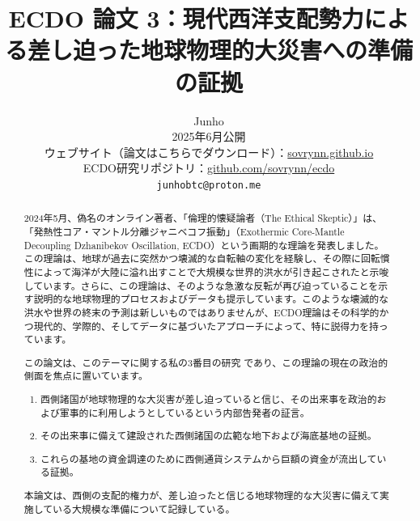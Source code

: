 \documentclass[10pt,twocolumn,letterpaper]{article}
\begin{document}
\title{ECDO 論文 3：現代西洋支配勢力による差し迫った地球物理的大災害への準備の証拠}

\author{Junho\\
2025年6月公開\\
ウェブサイト（論文はこちらでダウンロード）：\href{https://sovrynn.github.io}{sovrynn.github.io}\\
ECDO研究リポジトリ：\href{https://github.com/sovrynn/ecdo}{github.com/sovrynn/ecdo}\\
{\tt\small junhobtc@proton.me}
}

\maketitle

\begin{abstract}
2024年5月、偽名のオンライン著者、「倫理的懐疑論者（The Ethical Skeptic）」\cite{0}は、「発熱性コア・マントル分離ジャニベコフ振動」（Exothermic Core-Mantle Decoupling Dzhanibekov Oscillation, ECDO）\cite{1}という画期的な理論を発表しました。この理論は、地球が過去に突然かつ壊滅的な自転軸の変化を経験し、その際に回転慣性によって海洋が大陸に溢れ出すことで大規模な世界的洪水が引き起こされたと示唆しています。さらに、この理論は、そのような急激な反転が再び迫っていることを示す説明的な地球物理的プロセスおよびデータも提示しています。このような壊滅的な洪水や世界の終末の予測は新しいものではありませんが、ECDO理論はその科学的かつ現代的、学際的、そしてデータに基づいたアプローチによって、特に説得力を持っています。

この論文は、このテーマに関する私の3番目の研究 \cite{2,3} であり、この理論の現在の政治的側面を焦点に置いています。
\begin{flushleft}
\begin{enumerate}
    \item 西側諸国が地球物理的な大災害が差し迫っていると信じ、その出来事を政治的および軍事的に利用しようとしているという内部告発者の証言。
    \item その出来事に備えて建設された西側諸国の広範な地下および海底基地の証拠。
    \item これらの基地の資金調達のために西側通貨システムから巨額の資金が流出している証拠。
\end{enumerate}
\end{flushleft}

本論文は、西側の支配的権力が、差し迫ったと信じる地球物理的な大災害に備えて実施している大規模な準備について記録している。
\end{abstract}
\end{document}
